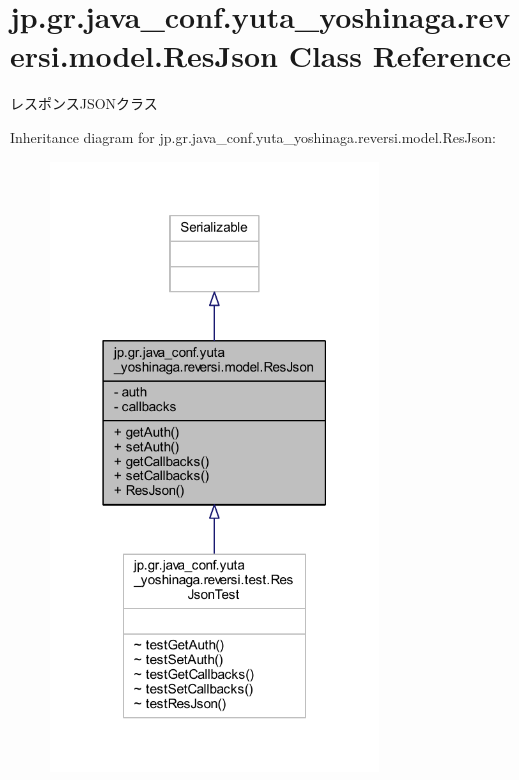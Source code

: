 \hypertarget{classjp_1_1gr_1_1java__conf_1_1yuta__yoshinaga_1_1reversi_1_1model_1_1_res_json}{}\section{jp.\+gr.\+java\+\_\+conf.\+yuta\+\_\+yoshinaga.\+reversi.\+model.\+Res\+Json Class Reference}
\label{classjp_1_1gr_1_1java__conf_1_1yuta__yoshinaga_1_1reversi_1_1model_1_1_res_json}


レスポンス\+J\+S\+O\+Nクラス  




Inheritance diagram for jp.\+gr.\+java\+\_\+conf.\+yuta\+\_\+yoshinaga.\+reversi.\+model.\+Res\+Json\+:
\nopagebreak
\begin{figure}[H]
\begin{center}
\leavevmode
\includegraphics[width=247pt]{classjp_1_1gr_1_1java__conf_1_1yuta__yoshinaga_1_1reversi_1_1model_1_1_res_json__inherit__graph}
\end{center}
\end{figure}


